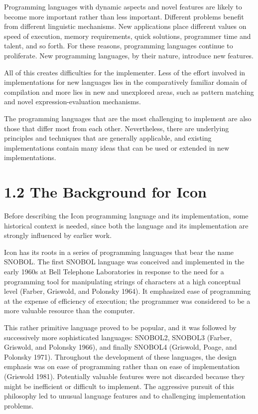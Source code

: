 Programming languages with dynamic aspects and novel features are
likely to become more important rather than less important. Different
problems benefit from different linguistic mechanisms. New
applications place different values on speed of execution, memory
requirements, quick solutions, programmer time and talent, and so
forth. For these reasons, programming languages continue to
proliferate. New programming languages, by their nature, introduce new
features.


All of this creates difficulties for the implementer. Less of the
effort involved in implementations for new languages lies in the
comparatively familiar domain of compilation and more lies in new and
unexplored areas, such as pattern matching and novel
expression-evaluation mechanisms.

The programming languages that are the most challenging to implement
are also those that differ most from each other.  Nevertheless, there
are underlying principles and techniques that are generally
applicable, and existing implementations contain many ideas that can
be used or extended in new implementations.

\section[1.2 The Background for Icon]{1.2 The Background for Icon}

Before describing the Icon programming language and its
implementation, some historical context is needed, since both the
language and its implementation are strongly influenced by earlier
work.

Icon has its roots in a series of programming languages that bear the
name SNOBOL. The first SNOBOL language was conceived and implemented
in the early 1960s at Bell Telephone Laboratories in response to the
need for a programming tool for manipulating strings of characters at
a high conceptual level (Farber, Griswold, and Polonsky 1964). It
emphasized ease of programming at the expense of efficiency of
execution; the programmer was considered to be a more valuable
resource than the computer.

This rather primitive language proved to be popular, and it was
followed by successively more sophisticated languages: SNOBOL2,
SNOBOL3 (Farber, Griswold, and Polonsky 1966), and finally SNOBOL4
(Griswold, Poage, and Polonsky 1971).  Throughout the development of
these languages, the design emphasis was on ease of programming rather
than on ease of implementation (Griswold 1981). Potentially valuable
features were not discarded because they might be inefficient or
difficult to implement. The aggressive pursuit of this philosophy led
to unusual language features and to challenging implementation
problems.

